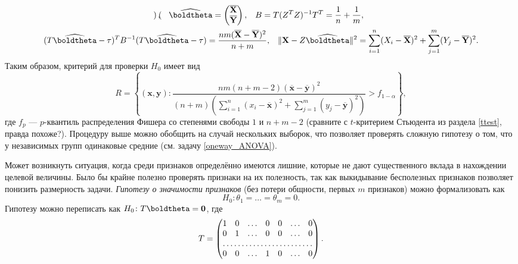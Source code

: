 \begin{example}
\begin{gather*}
\begin{pmatrix}
        \end{pmatrix},\;\;\;
        \widehat{\boldtheta} = \begin{pmatrix}
            \overline{\mathbf X}\\ \overline{\mathbf Y}
        \end{pmatrix},\;\;\;
        B = T(Z^T Z)^{-1} T^T = \frac{1}{n} + \frac{1}{m},\\
        (T\widehat{\boldtheta} - \tau)^T B^{-1} (T\widehat{\boldtheta} - \tau) = \frac{nm(\overline{\mathbf X} - \overline{\mathbf Y})^2}{n+m},\;\;\;
        \|\mathbf X - Z \widehat{\boldtheta}\|^2 = \sum_{i=1}^{n} (X_i - \overline{\mathbf X})^2 + \sum_{j=1}^{m} (Y_j - \overline{\mathbf Y})^2.
    \end{gather*}
    Таким образом, критерий для проверки $H_0$ имеет вид
    \[
    R = \left\{(\mathbf{x}, \mathbf{y})\colon \frac{nm(n+m-2)(\overline{\mathbf{x}} - \overline{\mathbf{y}})^2}{(n+m)\left(\sum_{i=1}^{n} (x_i - \overline{\mathbf{x}})^2 + \sum_{j=1}^{m} (y_j - \overline{\mathbf{y}})^2\right)} > f_{1-\alpha}\right\},
    \]
    где $f_{p}$ --- $p$-квантиль распределения Фишера со степенями свободы $1$ и $n+m-2$ (сравните с $t$-критерием Стьюдента из раздела \ref{ttest}, правда похоже?). Процедуру выше можно обобщить на случай нескольких выборок, что позволяет проверять сложную гипотезу о том, что у независимых групп одинаковые средние (см. задачу \ref{oneway_ANOVA}).
\end{example}

\begin{example}\label{important_features}
    Может возникнуть ситуация, когда среди признаков определённо имеются лишние, которые не дают существенного вклада в нахождении целевой величины. Было бы крайне полезно проверять признаки на их полезность, так как выкидывание бесполезных признаков позволяет понизить размерность задачи. \textit{Гипотезу о значимости признаков} (без потери общности, первых $m$ признаков) можно формализовать как
    \[
    H_0\colon \theta_1 = \ldots = \theta_m = 0.
    \]
    Гипотезу можно переписать как $H_0\colon T\boldtheta = \mathbf{0}$, где 
    \[
    T = 
    \begin{pmatrix}
        1 & 0 & \ldots & 0 & 0 & \ldots & 0\\
        0 & 1 & \ldots & 0 & 0 & \ldots & 0\\
        \hdotsfor{7}\\
        0 & 0 & \ldots & 1 & 0 & \ldots & 0
    \end{pmatrix}.
    \]
\end{example}

